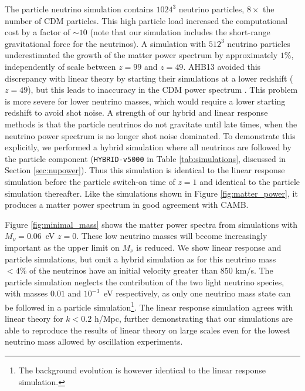 \documentclass[useAMS, usenatbib]{mnras}
\begin{document}
The particle neutrino simulation contains $1024^3$ neutrino particles, $8\times$ the number of CDM particles. This high particle load increased the computational cost by a factor of $\sim 10$ (note that our simulation includes the short-range gravitational force for the neutrinos). A simulation with $512^3$ neutrino particles underestimated the growth of the matter power spectrum by approximately $1\%$, independently of scale between $z=99$ and $z=49$. AHB13 avoided this discrepancy with linear theory by starting their simulations at a lower redshift ($z=49$), but this leads to inaccuracy in the CDM power spectrum \citep{Heitmann:2010}. This problem is more severe for lower neutrino masses, which would require a lower starting redshift to avoid shot noise. A strength of our hybrid and linear response methods is that the particle neutrinos do not gravitate until late times, when the neutrino power spectrum is no longer shot noise dominated. To demonstrate this explicitly, we performed a hybrid simulation where all neutrinos are followed by the particle component (\texttt{HYBRID-v5000} in Table \ref{tab:simulations}, discussed in Section \ref{sec:nupower}). Thus this simulation is identical to the linear response simulation before the particle switch-on time of $z=1$ and identical to the particle simulation thereafter. Like the simulations shown in Figure \ref{fig:matter_power}, it produces a matter power spectrum in good agreement with CAMB.

Figure \ref{fig:minimal_mass} shows the matter power spectra from simulations with $M_\nu = 0.06$~eV $z=0$. These low neutrino masses will become increasingly important as the upper limit on $M_\nu$ is reduced. We show linear response and particle simulations, but omit a hybrid simulation as for this neutrino mass $ < 4\%$ of the neutrinos have an initial velocity greater than $850$ km/s. The particle simulation neglects the contribution of the two light neutrino species, with masses $0.01$ and $10^{-3}$~eV respectively, as only one neutrino mass state can be followed in a particle simulation\footnote{The background evolution is however identical to the linear response simulation.}. The linear response simulation agrees with linear theory for $k < 0.2$ h/Mpc, further demonstrating that our simulations are able to reproduce the results of linear theory on large scales even for the lowest neutrino mass allowed by oscillation experiments.
\end{document}
